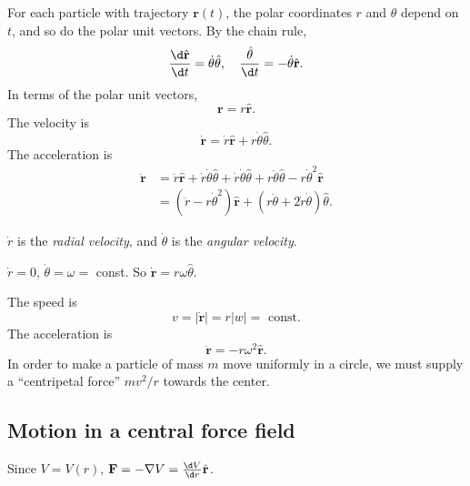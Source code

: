 \documentclass[a4paper]{article}
\begin{document}
\begin{prop}
  For each particle with trajectory $\mathbf{r}(t)$, the polar coordinates $r$ and $\theta$ depend on $t$, and so do the polar unit vectors. By the chain rule,
  \[
    \frac{\d \hat{\mathbf{r}}}{\d t} = \dot{\theta}\hat{\theta},\quad \frac{\hat{\theta}}{\d t} = -\dot{\theta} \hat{\mathbf{r}}.
  \]
  In terms of the polar unit vectors, 
  \[
    \mathbf{r} = r\hat{\mathbf{r}}.
  \]
  The velocity is
  \[
    \dot{\mathbf{r}} = \dot{r} \hat{\mathbf{r}} + r\dot{\theta} \hat{\theta}.
  \]
  The acceleration is
  \begin{align*}
    \ddot{\mathbf{r}} &= \ddot{r} \hat{\mathbf{r}} + \dot{r}\dot{\theta}\hat{\theta} + \dot{r}\dot{\theta}\hat{\theta} + r\ddot{\theta}\hat{\theta} - r\dot{\theta}^2\hat{\mathbf{r}}\\
    &= (\ddot{r} - r\dot{\theta}^2)\hat{\mathbf{r}} + (r\ddot{\theta} + 2\dot{r}\dot{\theta})\hat{\theta}.
  \end{align*}
\end{prop}

\begin{defi}
  $\dot{r}$ is the \emph{radial velocity}, and $\dot{\theta}$ is the \emph{angular velocity}.
\end{defi}

\begin{eg}
  $\dot{r} = 0$, $\dot{\theta} = \omega = $ const.  So $\dot{\mathbf{r}} = r\omega\hat{\theta}$.

  The speed is 
  \[
    v = |\dot{\mathbf{r}}| = r|w| = \text{ const}.
  \]
  The acceleration is
  \[
    \ddot{\mathbf{r}} = -r\omega^2 \hat{\mathbf{r}}.
  \]
  In order to make a particle of mass $m$ move uniformly in a circle, we must supply a ``centripetal force'' $mv^2/r$ towards the center.
\end{eg}

\subsection{Motion in a central force field}
Since $V = V(r)$, $\mathbf{F} = -\nabla V = \frac{\d V}{\d r} \hat{\mathbf{r}}$.
\end{document}
